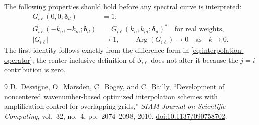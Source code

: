 \documentclass[11pt]{article}
\numberwithin{equation}{section}
\DeclareMathOperator{\Arg}{Arg}
\begin{document}
The following properties should hold before any spectral curve is interpreted:
\begin{align}
    G_{i\ell}(0,0;\bm{\delta}_d)&=1,
    \label{eq:constant-mode-check}\\
    G_{i\ell}(-k_n,-k_m;\bm{\delta}_d)
    &=
    G_{i\ell}(k_n,k_m;\bm{\delta}_d)^{*}
    \quad\text{for real weights},
    \label{eq:conjugate-symmetry-check}\\
    |G_{i\ell}|&\rightarrow1,
    \qquad
    \Arg(G_{i\ell})\rightarrow0
    \quad\text{as}\quad k\rightarrow0.
    \label{eq:low-wavenumber-check}
\end{align}
The first identity follows exactly from the difference form in \cref{eq:interpolation-operator}; the center-inclusive definition of $\mathcal S_{i\ell}$ does not alter it because the $j=i$ contribution is zero.

\begin{thebibliography}{9}
D.~Desvigne, O.~Marsden, C.~Bogey, and C.~Bailly,
``Development of noncentered wavenumber-based optimized interpolation schemes with amplification control for overlapping grids,''
\emph{SIAM Journal on Scientific Computing}, vol.~32, no.~4, pp.~2074--2098, 2010.
\href{https://doi.org/10.1137/090758702}{doi:10.1137/090758702}.
\end{thebibliography}
\end{document}
